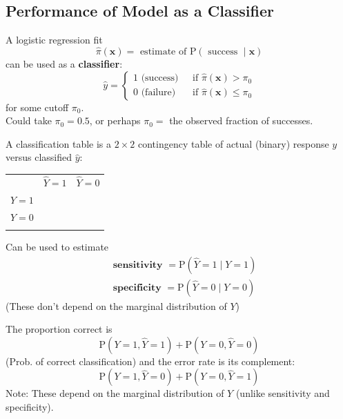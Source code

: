 \documentclass[11pt]{elegantbook}
\begin{document}
\subsection{Performance of Model as a Classifier}
\begin{definition}[Classifier]
\normalfont
A logistic regression fit
$$
\hat{\pi}(\boldsymbol{x})=\text { estimate of } \mathrm{P}(\text { success } \mid \boldsymbol{x})
$$
can be used as a \textbf{classifier}:
$$
\hat{y}= \begin{cases}1 \text { (success) } & \text { if } \hat{\pi}(\boldsymbol{x})>\pi_0 \\ 0 \text { (failure) } & \text { if } \hat{\pi}(\boldsymbol{x}) \leq \pi_0\end{cases}
$$
for some cutoff $\pi_0$.\\
Could take $\pi_0=0.5$, or perhaps $\pi_0=$ the observed fraction of successes.
\end{definition}

\begin{definition}
\normalfont
A classification table is a $2 \times 2$ contingency table of actual (binary) response $y$ versus classified $\hat{y}$:
\begin{center}
    \begin{tabular}{rcccc}
        \multicolumn{1}{r}{}&\multicolumn{2}{c}{$\hat{Y}=1$}&\multicolumn{2}{c}{$\hat{Y}=0$}\\
        \cline{2-5}
        \multicolumn{1}{r|}{$Y=1$}&\multicolumn{2}{c|}{}&\multicolumn{2}{c|}{}\\
        \cline{2-5}
        \multicolumn{1}{r|}{$Y=0$}&\multicolumn{2}{c|}{}&\multicolumn{2}{c|}{}\\
        \cline{2-5}
        \multicolumn{1}{c}{}&&&&
    \end{tabular}
\end{center}
Can be used to estimate
$$
\begin{aligned}
& \textbf{ sensitivity }=\mathrm{P}(\hat{Y}=1 \mid Y=1) \\
& \textbf{ specificity }=\mathrm{P}(\hat{Y}=0 \mid Y=0)
\end{aligned}
$$
(These don't depend on the marginal distribution of $Y$)
\end{definition}
The proportion correct is
$$
\mathrm{P}(Y=1, \hat{Y}=1)+\mathrm{P}(Y=0, \hat{Y}=0)
$$
(Prob. of correct classification)
and the error rate is its complement:
$$
\mathrm{P}(Y=1, \hat{Y}=0)+\mathrm{P}(Y=0, \hat{Y}=1)
$$
Note: These depend on the marginal distribution of $Y$ (unlike sensitivity and specificity).
\end{document}
